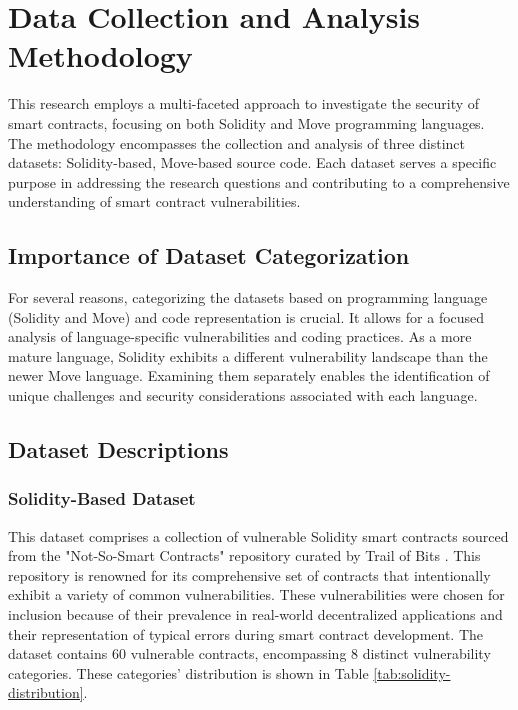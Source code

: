 \section{Data Collection and Analysis Methodology}

This research employs a multi-faceted approach to investigate the security of smart contracts, focusing on both Solidity and Move programming languages. The methodology encompasses the collection and analysis of three distinct datasets: Solidity-based, Move-based source code. Each dataset serves a specific purpose in addressing the research questions and contributing to a comprehensive understanding of smart contract vulnerabilities.

\subsection{Importance of Dataset Categorization}

For several reasons, categorizing the datasets based on programming language (Solidity and Move) and code representation is crucial. It allows for a focused analysis of language-specific vulnerabilities and coding practices. As a more mature language, Solidity exhibits a different vulnerability landscape than the newer Move language. Examining them separately enables the identification of unique challenges and security considerations associated with each language. 


\subsection{Dataset Descriptions}

\subsubsection{Solidity-Based Dataset}
This dataset comprises a collection of vulnerable Solidity smart contracts sourced from the "Not-So-Smart Contracts" repository curated by Trail of Bits \cite{githubGitHubCryticnotsosmartcontracts}. This repository is renowned for its comprehensive set of contracts that intentionally exhibit a variety of common vulnerabilities. These vulnerabilities were chosen for inclusion because of their prevalence in real-world decentralized applications and their representation of typical errors during smart contract development. 
%
The dataset contains 60 vulnerable contracts, encompassing 8 distinct vulnerability categories. These categories' distribution is shown in Table \ref{tab:solidity-distribution}.

